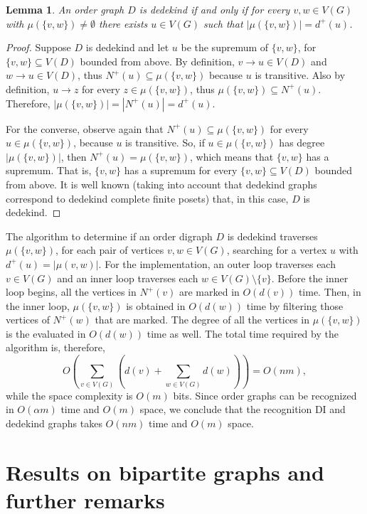 \documentclass[a4paper,11pt]{article}
\newtheorem{lemma}[theorem]{Lemma}
\begin{document}
\begin{lemma}
  An order graph $D$ is dedekind if and only if for every $v,w \in V(G)$ with $\mu(\{v,w\}) \neq \emptyset$ there exists $u \in V(G)$ such that $|\mu(\{v,w\})| = d^+(u)$.
\end{lemma}

\begin{proof}
  Suppose $D$ is dedekind and let $u$ be the supremum of $\{v,w\}$, for $\{v,w\} \subseteq V(D)$ bounded from above.  By definition, $v \to u \in V(D)$ and $w \to u \in V(D)$, thus $N^+(u) \subseteq \mu(\{v,w\})$ because $u$ is transitive.  Also by definition, $u \to z$ for every $z \in \mu(\{v,w\})$, thus $\mu(\{v,w\}) \subseteq N^+(u)$.  Therefore, $|\mu(\{v,w\})| = |N^+(u)| = d^+(u)$.

  For the converse, observe again that $N^+(u) \subseteq \mu(\{v,w\})$ for every $u \in \mu(\{v,w\})$, because $u$ is transitive.  So, if $u \in \mu(\{v,w\})$ has degree $|\mu(\{v,w\})|$, then $N^+(u) = \mu(\{v,w\})$, which means that $\{v,w\}$ has a supremum.  That is, $\{v,w\}$ has a supremum for every $\{v,w\} \subseteq V(D)$ bounded from above.  It is well known (taking into account that dedekind graphs correspond to dedekind complete finite posets) that, in this case, $D$ is dedekind.
\end{proof}

The algorithm to determine if an order digraph $D$ is dedekind traverses $\mu(\{v,w\})$, for each pair of vertices $v,w \in V(G)$, searching for a vertex $u$ with $d^+(u) = |\mu(v,w)|$.  For the implementation, an outer loop traverses each $v \in V(G)$ and an inner loop traverses each $w \in V(G) \setminus \{v\}$.  Before the inner loop begins, all the vertices in $N^+(v)$ are marked in $O(d(v))$ time.  Then, in the inner loop, $\mu(\{v,w\})$ is obtained in $O(d(w))$ time by filtering those vertices of $N^+(w)$ that are marked.  The degree of all the vertices in $\mu(\{v,w\})$ is the evaluated in $O(d(w))$ time as well.  The total time required by the algorithm is, therefore, \[O\left(\sum_{v \in V(G)}\left(d(v) + \sum_{w \in V(G)}d(w)\right)\right) = O(nm),\]
while the space complexity is $O(m)$ bits.  Since order graphs can be recognized in $O(\alpha m)$ time and $O(m)$ space, we conclude that the recognition DI and dedekind graphs takes $O(nm)$ time and $O(m)$ space.

\section{Results on bipartite graphs and further remarks}
\label{sec:further remarks}
\end{document}
